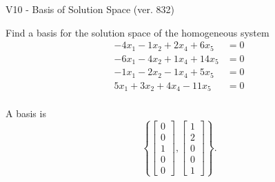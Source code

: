 \begin{exercise}
  \begin{exerciseTitle}V10 - Basis of Solution Space (ver. 832)\end{exerciseTitle}
  \begin{exerciseStatement}
    Find a basis for the solution space of the homogeneous system 
\begin{align*}
 -4 x_ 1 -1 x_ 2 + 2 x_ 4 + 6 x_ 5 &= 0  \\ 
  -6 x_ 1 -4 x_ 2 + 1 x_ 4 + 14 x_ 5 &= 0  \\ 
  -1 x_ 1 -2 x_ 2 -1 x_ 4 + 5 x_ 5 &= 0  \\ 
  5 x_ 1 + 3 x_ 2 + 4 x_ 4 -11 x_ 5 &= 0  \\ 
 \end{align*}


 
  \end{exerciseStatement}

  \begin{exerciseAnswer}
   A basis is   
\[\left\{\left[\begin{array}{c}
0 \\
0 \\
1 \\
0 \\
0
\end{array}\right] , \left[\begin{array}{c}
1 \\
2 \\
0 \\
0 \\
1
\end{array}\right]\right\}.\]

  


  \end{exerciseAnswer}
\end{exercise}